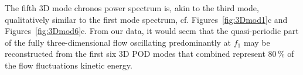 {{{The fifth 3D mode chronos {power} spectrum is, akin to the third mode, {qualitatively similar to the first mode spectrum}, cf. Figures~\ref{fig:3Dmod1}c and Figures~\ref{fig:3Dmod6}c. {From our data, it would seem that the quasi-periodic part of the fully three-dimensional flow oscillating predominantly at $f_{1}$} may be reconstructed from the first six 3D POD modes that combined represent {$80\,\%$} of the flow fluctuations kinetic energy.



}}}
